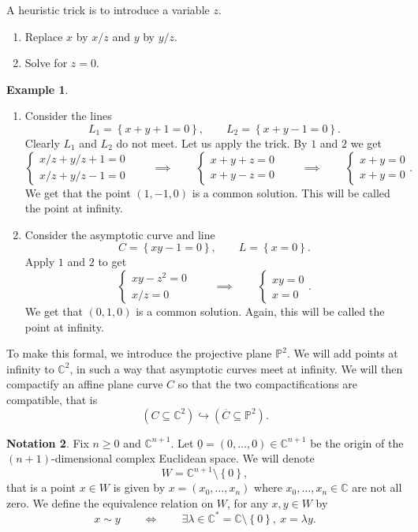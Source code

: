 \documentclass{article}
\newcommand{\C}{\mathbb{C}}
\renewcommand{\P}{\mathbb{P}}
\newcommand{\rb}[1]{\left( #1 \right)}
\newcommand{\cb}[1]{\left\{ #1 \right\}}
\theoremstyle{definition}\newtheorem{definition}{Definition}[section]
\theoremstyle{definition}\newtheorem{notation}[definition]{Notation}
\theoremstyle{definition}\newtheorem{remark}[definition]{Remark}
\theoremstyle{definition}\newtheorem{example}[definition]{Example}
\theoremstyle{definition}\newtheorem{fact}{Fact}
\theoremstyle{definition}\newtheorem{exercise}{Exercise}
\begin{document}
A heuristic trick is to introduce a variable $ z $.
\begin{enumerate}
\item Replace $ x $ by $ x / z $ and $ y $ by $ y / z $.
\item Solve for $ z = 0 $.
\end{enumerate}

\begin{example}
\hfill
\begin{enumerate}
\item Consider the lines
$$ L_1 = \cb{x + y + 1 = 0}, \qquad L_2 = \cb{x + y - 1 = 0}. $$
Clearly $ L_1 $ and $ L_2 $ do not meet. Let us apply the trick. By $ 1 $ and $ 2 $ we get
$$ \begin{cases} x / z + y / z + 1 = 0 \\ x / z + y / z - 1 = 0 \end{cases} \qquad \implies \qquad \begin{cases} x + y + z = 0 \\ x + y - z = 0 \end{cases} \qquad \implies \qquad \begin{cases} x + y = 0 \\ x + y = 0 \end{cases}. $$
We get that the point $ \rb{1, -1, 0} $ is a common solution. This will be called the point at infinity.
\item Consider the asymptotic curve and line
$$ C = \cb{xy - 1 = 0}, \qquad L = \cb{x = 0}. $$
Apply $ 1 $ and $ 2 $ to get
$$ \begin{cases} xy - z^2 = 0 \\ x / z = 0 \end{cases} \qquad \implies \qquad \begin{cases} xy = 0 \\ x = 0 \end{cases}. $$
We get that $ \rb{0, 1, 0} $ is a common solution. Again, this will be called the point at infinity.
\end{enumerate}
\end{example}

To make this formal, we introduce the projective plane $ \P^2 $. We will add points at infinity to $ \C^2 $, in such a way that asymptotic curves meet at infinity. We will then compactify an affine plane curve $ C $ so that the two compactifications are compatible, that is
$$ \rb{C \subseteq \C^2} \hookrightarrow \rb{\overline{C} \subseteq \P^2}. $$

\begin{notation}
Fix $ n \ge 0 $ and $ \C^{n + 1} $. Let $ \underline{0} = \rb{0, \dots, 0} \in \C^{n + 1} $ be the origin of the $ \rb{n + 1} $-dimensional complex Euclidean space. We will denote
$$ W = \C^{n + 1} \setminus \cb{0}, $$
that is a point $ x \in W $ is given by $ x = \rb{x_0, \dots, x_n} $ where $ x_0, \dots, x_n \in \C $ are not all zero. We define the equivalence relation on $ W $, for any $ x, y \in W $ by
$$ x \sim y \qquad \iff \qquad \exists \lambda \in \C^* = \C \setminus \cb{0}, \ x = \lambda y. $$
\end{notation}
\end{document}
